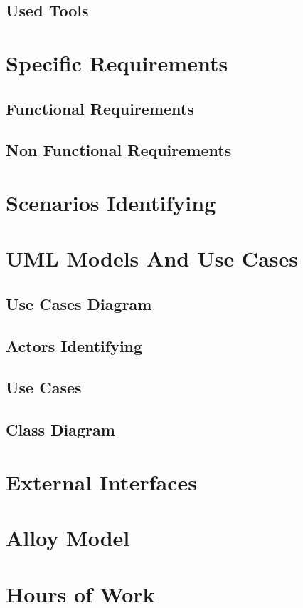 \documentclass[english]{article}
\begin{document}
	\subsection{Used Tools}

\section{Specific Requirements}
	\subsection{Functional Requirements}
	\subsection{Non Functional Requirements}

\section{Scenarios Identifying}
\section{UML Models And Use Cases}
	\subsection{Use Cases Diagram}
	\subsection{Actors Identifying}
	\subsection{Use Cases}

	\subsection{Class Diagram}
\section{External Interfaces}
\section{Alloy Model}
\section{Hours of Work}
\end{document}

